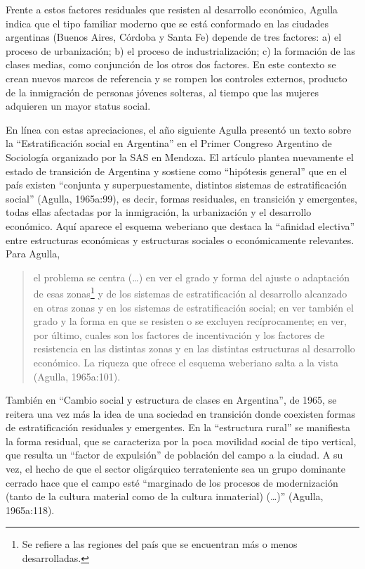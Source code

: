 Frente a estos factores residuales que resisten al desarrollo económico, Agulla indica que el tipo familiar moderno que se está conformado en las ciudades argentinas (Buenos Aires, Córdoba y Santa Fe) depende de tres factores: a) el proceso de urbanización; b) el proceso de industrialización; c) la formación de las clases medias, como conjunción de los otros dos factores. En este contexto se crean nuevos marcos de referencia y se rompen los controles externos, producto de la inmigración de personas jóvenes solteras, al tiempo que las mujeres adquieren un mayor status social.

En línea con estas apreciaciones, el año siguiente Agulla presentó un texto sobre la ``Estratificación social en Argentina'' en el Primer Congreso Argentino de Sociología organizado por la SAS en Mendoza. El artículo plantea nuevamente el estado de transición de Argentina y sostiene como ``hipótesis general'' que en el país existen ``conjunta y superpuestamente, distintos sistemas de estratificación social'' (Agulla, 1965a:99), es decir, formas residuales, en transición y emergentes, todas ellas afectadas por la inmigración, la urbanización y el desarrollo económico. Aquí aparece el esquema weberiano que destaca la ``afinidad electiva'' entre estructuras económicas y estructuras sociales o económicamente relevantes. Para Agulla,

\begin{quote}
el problema se centra (\dots) en ver el grado y forma del ajuste o adaptación de esas zonas\footnote{Se refiere a las regiones del país que se encuentran más o menos desarrolladas.} y de los sistemas de estratificación al desarrollo alcanzado en otras zonas y en los sistemas de estratificación social; en ver también el grado y la forma en que se resisten o se excluyen recíprocamente; en ver, por último, cuales son los factores de incentivación y los factores de resistencia en las distintas zonas y en las distintas estructuras al desarrollo económico. La riqueza que ofrece el esquema weberiano salta a la vista (Agulla, 1965a:101).
\end{quote}

También en ``Cambio social y estructura de clases en Argentina'', de 1965, se reitera una vez más la idea de una sociedad en transición donde coexisten formas de estratificación residuales y emergentes. En la ``estructura rural'' se manifiesta la forma residual, que se caracteriza por la poca movilidad social de tipo vertical, que resulta un ``factor de expulsión'' de población del campo a la ciudad. A su vez, el hecho de que el sector oligárquico terrateniente sea un grupo dominante cerrado hace que el campo esté ``marginado de los procesos de modernización (tanto de la cultura material como de la cultura inmaterial) (\dots)'' (Agulla, 1965a:118).

